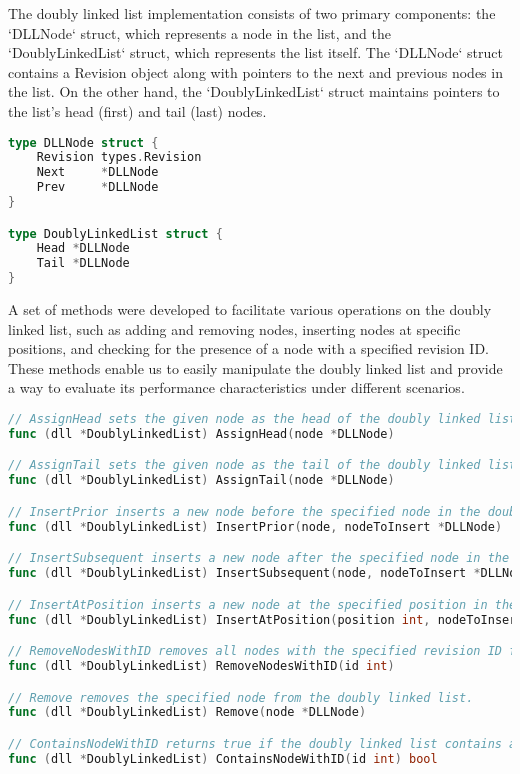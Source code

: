 The doubly linked list implementation consists of two primary components: the `DLLNode` struct, which represents a node in the list, and the `DoublyLinkedList` struct, which represents the list itself. The `DLLNode` struct contains a Revision object along with pointers to the next and previous nodes in the list. On the other hand, the `DoublyLinkedList` struct maintains pointers to the list's head (first) and tail (last) nodes.

\begin{lstlisting}[language=Go]
type DLLNode struct {
	Revision types.Revision
	Next     *DLLNode
	Prev     *DLLNode
}

type DoublyLinkedList struct {
	Head *DLLNode
	Tail *DLLNode
}
\end{lstlisting}
\medskip

A set of methods were developed to facilitate various operations on the doubly linked list, such as adding and removing nodes, inserting nodes at specific positions, and checking for the presence of a node with a specified revision ID. These methods enable us to easily manipulate the doubly linked list and provide a way to evaluate its performance characteristics under different scenarios.

\begin{lstlisting}[language=Go]
// AssignHead sets the given node as the head of the doubly linked list.
func (dll *DoublyLinkedList) AssignHead(node *DLLNode)

// AssignTail sets the given node as the tail of the doubly linked list.
func (dll *DoublyLinkedList) AssignTail(node *DLLNode)

// InsertPrior inserts a new node before the specified node in the doubly linked list.
func (dll *DoublyLinkedList) InsertPrior(node, nodeToInsert *DLLNode)

// InsertSubsequent inserts a new node after the specified node in the doubly linked list.
func (dll *DoublyLinkedList) InsertSubsequent(node, nodeToInsert *DLLNode)

// InsertAtPosition inserts a new node at the specified position in the doubly linked list.
func (dll *DoublyLinkedList) InsertAtPosition(position int, nodeToInsert *DLLNode)

// RemoveNodesWithID removes all nodes with the specified revision ID from the doubly linked list.
func (dll *DoublyLinkedList) RemoveNodesWithID(id int)

// Remove removes the specified node from the doubly linked list.
func (dll *DoublyLinkedList) Remove(node *DLLNode)

// ContainsNodeWithID returns true if the doubly linked list contains a node with the specified revision ID.
func (dll *DoublyLinkedList) ContainsNodeWithID(id int) bool
\end{lstlisting}

